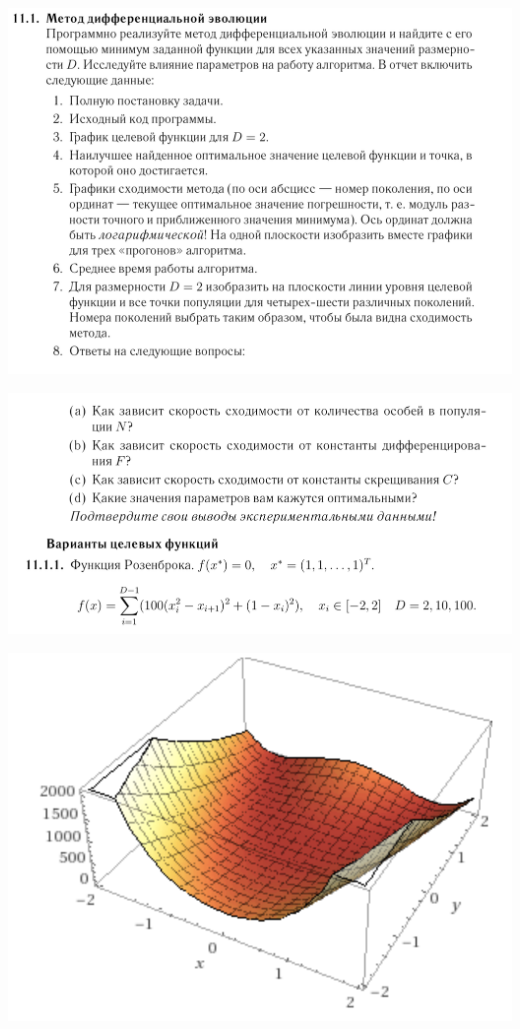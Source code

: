 \documentclass[10pt,a4paper]{article}
\begin{document}
	\includegraphics[width=0.8 \textwidth, keepaspectratio]{img/1}
	
	\includegraphics[width=0.8 \textwidth, keepaspectratio]{img/2}
	
	\includegraphics[width= 1 \textwidth, keepaspectratio]{img/3}
	
\end{document}
